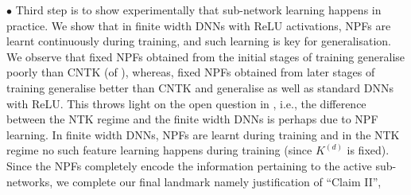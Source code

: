 $\bullet$ Third step is to show experimentally that sub-network learning happens in practice. We show that in finite width DNNs with ReLU activations, NPFs are learnt continuously during training, and such learning is key for generalisation. We observe that fixed NPFs obtained from the initial stages of training generalise poorly than CNTK (of \cite{arora2019exact}), whereas, fixed NPFs obtained from later stages of training generalise better than CNTK and generalise as well as standard DNNs with ReLU. This throws light on the open question in , i.e., the difference between the NTK regime and the finite width DNNs is perhaps due to NPF learning. In finite width DNNs, NPFs are learnt during training and in the NTK regime no such feature learning happens during training (since $K^{(d)}$ is fixed). Since the NPFs completely encode the information pertaining to the active sub-networks, we complete our final landmark namely  justification of ``Claim II'', 
